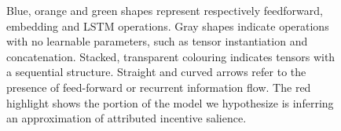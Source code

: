 \begin{figure}[ht]
\begin{center}
\begin{adjustbox}{width=0.5\textwidth}
\begin{tikzpicture}[x=0.75pt,y=0.75pt,yscale=-1,xscale=1]
\end{tikzpicture}

\end{adjustbox}
\end{center}
\caption[\textbf{Bifurcating Model (BM) Architecture}]{Blue, orange and green shapes represent respectively feedforward, embedding and LSTM operations. Gray shapes indicate operations with no learnable parameters, such as tensor instantiation and concatenation. Stacked, transparent colouring indicates tensors with a sequential structure. Straight and curved arrows refer to the presence of feed-forward or recurrent information flow. The red highlight shows the portion of the model we hypothesize is inferring an approximation of attributed incentive salience.}
\label{fig: rnn_1}
\end{figure}